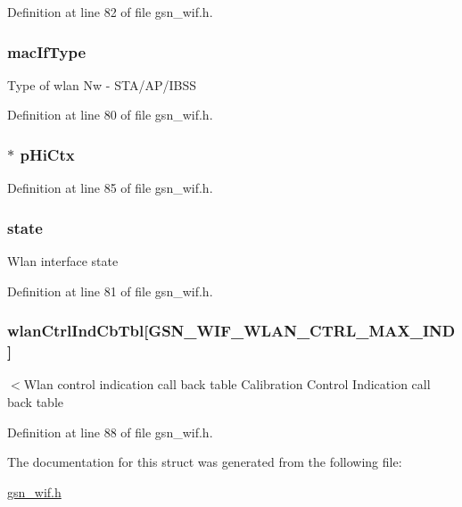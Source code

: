 Definition at line 82 of file gsn\_\-wif.h.

\hypertarget{a00323_a3ee37b79013f1da93271b12024198eed}{
\subsubsection[{macIfType}]{ {\bf macIfType}}}
\label{a00323_a3ee37b79013f1da93271b12024198eed}
Type of wlan Nw -\/ STA/AP/IBSS 

Definition at line 80 of file gsn\_\-wif.h.

\hypertarget{a00323_ab671e23204d79f8fda7dba9992c3d6e9}{
\subsubsection[{pHiCtx}]{$\ast$ {\bf pHiCtx}}}
\label{a00323_ab671e23204d79f8fda7dba9992c3d6e9}


Definition at line 85 of file gsn\_\-wif.h.

\hypertarget{a00323_a3f6086ca990f81e2275fbe02baf56620}{
\subsubsection[{state}]{ {\bf state}}}
\label{a00323_a3f6086ca990f81e2275fbe02baf56620}
Wlan interface state 

Definition at line 81 of file gsn\_\-wif.h.

\hypertarget{a00323_acda926f459f060896e5bc461acf633fb}{
\subsubsection[{wlanCtrlIndCbTbl}]{ {\bf wlanCtrlIndCbTbl}\mbox{[}GSN\_\-WIF\_\-WLAN\_\-CTRL\_\-MAX\_\-IND\mbox{]}}}
\label{a00323_acda926f459f060896e5bc461acf633fb}
$<$Wlan control indication call back table Calibration Control Indication call back table 

Definition at line 88 of file gsn\_\-wif.h.



The documentation for this struct was generated from the following file:\begin{DoxyCompactItemize}
\item 
\hyperlink{a00605}{gsn\_\-wif.h}\end{DoxyCompactItemize}
